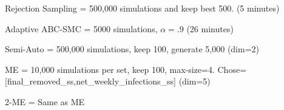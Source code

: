 \documentclass[11pt,a4paper]{article}
\theoremstyle{break}
\begin{document}
  \par Rejection Sampling = 500,000 simulations and keep best 500. (5 minutes)
  \par Adaptive ABC-SMC = 5000 simulations, $\alpha=.9$ (26 minutes)
  \par Semi-Auto = 500,000 simulations, keep 100, generate 5,000 (dim=2)
  \par ME = 10,000 simulations per set, keep 100, max-size=4. Chose=[final\_removed\_ss,net\_weekly\_infections\_ss] (dim=5)
  \par 2-ME = Same as ME

  \begin{figure}[H]
    \centering
\end{figure}
\end{document}
